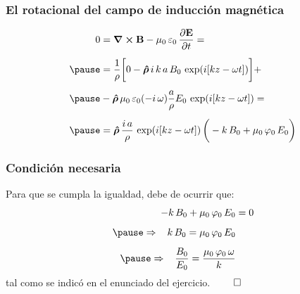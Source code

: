 \documentclass[12pt]{beamer}
\begin{document}
\begin{frame}
\frametitle{El rotacional del campo de inducción magnética}
\begin{eqnarray*}
\begin{aligned}
0 &= \curl{\vb{B}} - \mu_{0} \, \varepsilon_{0} \, \pdv{\vb{E}}{t} = \\[0.5em] \pause
&= \dfrac{1}{\rho} \bigg[ 0 - \vu{\bm{\rho}} \, i \, k \, a \, B_{0} \, \exp(i [k z - \omega t]) \bigg] + \\[0.5em] \pause
&- \vu{\bm{\rho}} \, \mu_{0} \, \varepsilon_{0} (- i \, \omega) \dfrac{a}{\rho} E_{0} \, \exp(i [k z - \omega t]) = \\[0.5em] \pause
&= \vu{\bm{\rho}} \, \dfrac{i \, a}{\rho} \, \exp(i [k z - \omega t]) \, \bigg( - k \, B_{0} + \mu_{0} \, \varphi_{0} \, E_{0} \bigg)
\end{aligned}
\end{eqnarray*}
\end{frame}
\begin{frame}
\frametitle{Condición necesaria}
Para que se cumpla la igualdad, debe de ocurrir que:
\pause
\begin{eqnarray*}
- k \, B_{0} + \mu_{0} \, \varphi_{0} \, E_{0} &= 0 \\[0.5em] \pause
\Rightarrow \hspace{0.3cm} k \, B_{0} = \mu_{0} \, \varphi_{0} \, E_{0} \\[0.5em] \pause
\Rightarrow \hspace{0.3cm} \dfrac{B_{0}}{E_{0}} = \dfrac{\mu_{0} \, \varphi_{0} \, \omega}{k}
\end{eqnarray*}
tal como se indicó en el enunciado del ejercicio. $\qed$
\end{frame}
\end{document}
